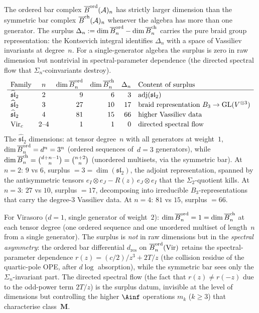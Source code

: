 \begin{computation}
\label{comp:e1-einfty-dimension-surplus}
The ordered bar complex $\overline{B}^{\mathrm{ord}}(\mathcal{A})_n$
has strictly larger dimension than the symmetric bar complex
$\overline{B}^{\mathrm{ch}}(\mathcal{A})_n$ whenever the algebra has more than one
generator. The surplus
$\Delta_n := \dim\overline{B}^{\mathrm{ord}}_n
- \dim\overline{B}^{\mathrm{ch}}_n$ carries the pure braid group
representation: the Kontsevich integral identifies
$\Delta_n$ with a space of Vassiliev invariants at
degree~$n$. For a single-generator algebra the
surplus is zero in raw dimension but nontrivial in
spectral-parameter dependence (the directed spectral
flow that $\Sigma_n$-coinvariants destroy).
\[
\renewcommand{\arraystretch}{1.15}
\begin{array}{lcrrrl}
\text{Family}
 & n
 & \dim\Barchord_n
 & \dim\Barch_n
 & \Delta_n
 & \text{Content of surplus} \\
\hline
\widehat{\mathfrak{sl}}_2
 & 2 & 9 & 6 & 3
 & \mathrm{adj}(\mathfrak{sl}_2) \\
\widehat{\mathfrak{sl}}_2
 & 3 & 27 & 10 & 17
 & \text{braid representation } B_3\to\operatorname{GL}(V^{\otimes 3}) \\
\widehat{\mathfrak{sl}}_2
 & 4 & 81 & 15 & 66
 & \text{higher Vassiliev data} \\
\mathrm{Vir}_c
 & 2\text{--}4 & 1 & 1 & 0
 & \text{directed spectral flow}
\end{array}
\]
The $\widehat{\mathfrak{sl}}_2$ dimensions: at tensor
degree~$n$ with all generators at weight~$1$,
$\dim\overline{B}^{\mathrm{ord}}_n = d^n = 3^n$
(ordered sequences of~$d = 3$ generators), while
$\dim\overline{B}^{\mathrm{ch}}_n = \binom{d+n-1}{n} = \binom{n+2}{n}$
(unordered multisets, via the symmetric bar).
At $n = 2$: $9$ vs $6$, surplus $= 3 = \dim(\mathfrak{sl}_2)$,
the adjoint representation, spanned by the
antisymmetric tensors $e_I\otimes e_J - R(z)\,e_J\otimes e_I$
that the $\Sigma_2$-quotient kills.
At $n = 3$: $27$ vs $10$, surplus $= 17$, decomposing into
irreducible $B_3$-representations that carry the
degree-$3$ Vassiliev data. At $n = 4$: $81$ vs $15$,
surplus $= 66$.

For Virasoro ($d = 1$, single generator of weight~$2$):
$\dim\overline{B}^{\mathrm{ord}}_n = 1 = \dim\overline{B}^{\mathrm{ch}}_n$
at each tensor degree (one ordered sequence and one
unordered multiset of length~$n$ from a single generator).
The surplus is \emph{not} in raw dimensions but in the
\emph{spectral asymmetry}: the ordered bar differential
$d_{\mathrm{res}}$ on
$\overline{B}^{\mathrm{ord}}_n(\mathrm{Vir})$
retains the spectral-parameter dependence
$r(z) = (c/2)/z^3 + 2T/z$ (the collision residue of
the quartic-pole OPE, after $d\log$ absorption), while
the symmetric bar sees only the $\Sigma_n$-invariant
part. The directed spectral flow (the fact that
$r(z) \ne r(-z)$ due to the odd-power term
$2T/z$) is the surplus datum, invisible at the
level of dimensions but controlling the higher
$\Ainf$ operations $m_k$ ($k \ge 3$) that characterise
class~$\mathbf{M}$.
\end{computation}


